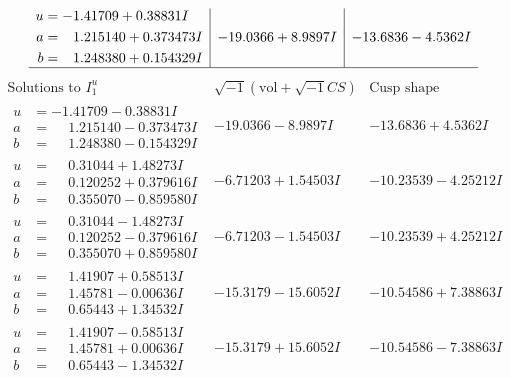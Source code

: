 \documentclass[1p]{elsarticle_modified}
\theoremstyle{definition}
\newcommand{\I}{\sqrt{-1}}
\begin{document}
$$\begin{array}{c|c|c}
\begin{aligned}
u &= -1.41709 + 0.38831 I \\
a &= \phantom{-}1.215140 + 0.373473 I \\
b &= \phantom{-}1.248380 + 0.154329 I\end{aligned}
 & -19.0366 + 8.9897 I & -13.6836 - 4.5362 I\\
 \hline 
 \end{array}$$\newpage$$\begin{array}{c|c|c}  
\text{Solutions to }I^u_{1}& \I (\text{vol} + \sqrt{-1}CS) & \text{Cusp shape}\\
 \hline 
\begin{aligned}
u &= -1.41709 - 0.38831 I \\
a &= \phantom{-}1.215140 - 0.373473 I \\
b &= \phantom{-}1.248380 - 0.154329 I\end{aligned}
 & -19.0366 - 8.9897 I & -13.6836 + 4.5362 I \\ \hline\begin{aligned}
u &= \phantom{-}0.31044 + 1.48273 I \\
a &= \phantom{-}0.120252 + 0.379616 I \\
b &= \phantom{-}0.355070 - 0.859580 I\end{aligned}
 & -6.71203 + 1.54503 I & -10.23539 - 4.25212 I \\ \hline\begin{aligned}
u &= \phantom{-}0.31044 - 1.48273 I \\
a &= \phantom{-}0.120252 - 0.379616 I \\
b &= \phantom{-}0.355070 + 0.859580 I\end{aligned}
 & -6.71203 - 1.54503 I & -10.23539 + 4.25212 I \\ \hline\begin{aligned}
u &= \phantom{-}1.41907 + 0.58513 I \\
a &= \phantom{-}1.45781 - 0.00636 I \\
b &= \phantom{-}0.65443 + 1.34532 I\end{aligned}
 & -15.3179 - 15.6052 I & -10.54586 + 7.38863 I \\ \hline\begin{aligned}
u &= \phantom{-}1.41907 - 0.58513 I \\
a &= \phantom{-}1.45781 + 0.00636 I \\
b &= \phantom{-}0.65443 - 1.34532 I\end{aligned}
 & -15.3179 + 15.6052 I & -10.54586 - 7.38863 I \\ \hline\begin{aligned}

\end{aligned}
\end{array}$$
\end{document}
